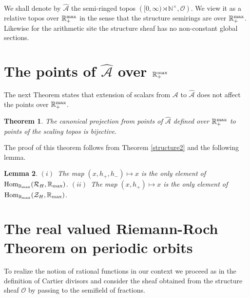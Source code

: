 \documentclass{elsart3-1}
\newtheorem{theorem}{Theorem}[section]
\newtheorem{lemma}[theorem]{Lemma}
\def\Hom{{\rm Hom}}
\def\N{{\mathbb N}}
\def\R{{\mathbb R}}
\def\aarith{{\mathscr A}}
\def\scal{{(\rnt,\cO)}}
\def\scal1{{\hat \aarith}}
\def\cO{{\mathcal O}}
\def\cR{{\mathcal R}}
\def\cZ{{\mathcal Z}}
\def\Hom {{\mbox{Hom}}}
\def\rmax{\R_+^{\rm max}}
\def\rma{\R_{\rm max}}
\def\rnt{{[0,\infty)\rtimes{\N^{\times}}}}
\def\vsp{\vspace{.05in}}
\begin{document}
We shall denote by $\scal1$ the semi-ringed topos $(\rnt,\cO)$. We  view it as a relative topos over $\rmax$ in the sense that the structure semirings are over $\rmax$. Likewise for the arithmetic site the structure sheaf has no non-constant global sections.
\vspace*{-.5cm}

\section{The points of  $\scal1$  over $\rmax$}
\vspace*{-.3cm}




The next  Theorem states that extension of scalars from $\aarith$ to $\scal1$ does not affect the points over $\rmax$.\vsp

\begin{theorem} \label{structure3} The canonical projection from points of $\scal1$ defined over $\rmax$ 
to points of the scaling topos  is bijective.
\end{theorem}
\vsp
The proof of this theorem follows from Theorem \ref{structure2} and the following lemma.
\vsp
\begin{lemma}\label{homtormax} $(i)$~The map $(x,h_+,h_-)\mapsto x$ is the only element of $\Hom_{\rma}(\cR_H,\rma)$.
\newline
$(ii)$~The map $(x,h_+)\mapsto x$ is the only element of $\Hom_{\rma}(\cZ_H,\rma)$.
\end{lemma}

\vspace*{-.5cm}


\section{The real valued Riemann-Roch Theorem on periodic orbits}

\vspace*{-.3cm}
To realize the notion of rational functions in our context we proceed as in the definition of Cartier divisors and consider the sheaf obtained from the structure sheaf $\cO$ by passing to the semifield of fractions.

\vsp
\end{document}
